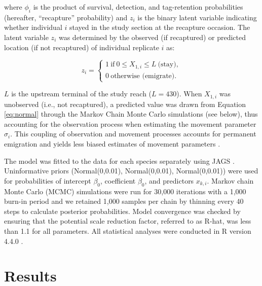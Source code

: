 \documentclass[11pt, class=article, crop=false]{standalone}
\begin{document}
where $\phi_i$ is the product of survival, detection, and tag-retention probabilities (hereafter, ``recapture'' probability) and $z_i$ is the binary latent variable indicating whether individual $i$ stayed in the study section at the recapture occasion.
The latent variable $z_i$ was determined by the observed (if recaptured) or predicted location (if not recaptured) of individual replicate $i$ as: 

\begin{equation}
    z_i =
    \begin{cases}
        1~\text{if}~0 \le X_{1,i} \le L~\text{(stay)},\\
        0~\text{otherwise (emigrate)}.
    \end{cases}
\end{equation}

$L$ is the upstream terminal of the study reach ($L = 430$). When $X_{1,i}$ was unobserved (i.e., not recaptured), a predicted value was drawn from Equation \ref{eq:normal} through the Markov Chain Monte Carlo simulations (see below), thus accounting for the observation process when estimating the movement parameter $\sigma_i$.
This coupling of observation and movement processes accounts for permanent emigration and yields less biased estimates of movement parameters \citep{teruiModelingDispersalUsing2020}.

The model was fitted to the data for each species separately using JAGS \citep{JAGSJustAnother}. Uninformative priors (Normal(0,0.01), Normal(0,0.01), Normal(0,0.01)) were used for probabilities of intercept $\beta_0$, coefficient $\beta_0$, and predictors $x_{k,i}$. Markov chain Monte Carlo (MCMC) simulations were run for 30,000 iterations with a 1,000 burn-in period and we retained 1,000 samples per chain by thinning every 40 steps to calculate posterior probabilities. Model convergence was checked by ensuring that the potential scale reduction factor, referred to as R-hat, was less than 1.1 for all parameters. All statistical analyses were conducted in R version 4.4.0 \citep{CoreTeam2020}.

\section{Results}
\end{document}
